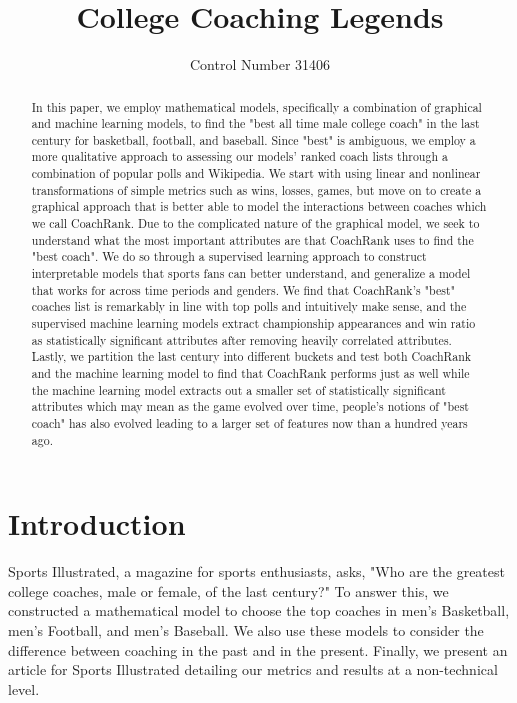 \documentclass[11pt,notitlepage]{article}
\begin{document}
\pagestyle{fancyplain}
\fancyhf{}
\setlength{\headsep}{0.2in} 

\title{College Coaching Legends}
\author{Control Number 31406}
\maketitle

\begin{abstract}
  In this paper, we employ mathematical models, specifically a combination of graphical and machine learning models, to find the 
"best all time male college coach" in the last century for basketball, football, and baseball. Since "best" is ambiguous, we employ a more
 qualitative approach to assessing our models' ranked coach lists through a combination of popular polls and Wikipedia. We start with using linear and nonlinear transformations of simple metrics such as wins, losses, games, but move on to create a graphical approach that is better able to model the interactions between coaches which we call CoachRank. Due to the complicated nature of the graphical model, we seek to understand what the most important
attributes are that CoachRank uses to find the "best coach". We do so through a supervised learning approach to construct interpretable models
that sports fans can better understand, and generalize a model that works for across time periods and genders. We find that CoachRank's "best" 
coaches list is remarkably in line with top polls and intuitively make sense, and the supervised machine learning models extract championship appearances and win ratio as statistically significant attributes after removing heavily correlated attributes. Lastly, we partition the last century into different buckets and test both CoachRank and the machine learning model to find that CoachRank performs just as well while the machine learning model extracts out a smaller set of statistically significant attributes which may mean as the game evolved over time, people's notions of "best coach" has also evolved leading to a larger set of features now than a hundred years ago.
\end{abstract}

\pagebreak

\tableofcontents

\section{Introduction}
Sports Illustrated, a magazine for sports enthusiasts, asks, "Who are the greatest college coaches, male or female, of the last century?" To answer this, we constructed a mathematical model to choose the top coaches in men's Basketball, men's Football, and men's Baseball. We also use these models to consider the difference between coaching in the past and in the present. Finally, we present an article for Sports Illustrated detailing our metrics and results at a non-technical level.
\end{document}
